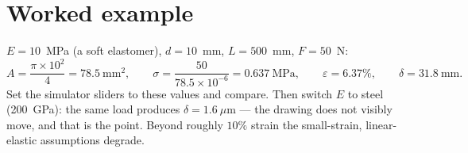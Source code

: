 \documentclass[10pt,a4paper]{article}
\begin{document}
\section*{Worked example}
$E = 10$~MPa (a soft elastomer), $d = 10$~mm, $L = 500$~mm, $F = 50$~N:
\begin{equation}
A = \frac{\pi \times 10^2}{4} = 78.5~\text{mm}^2, \qquad
\sigma = \frac{50}{78.5\times10^{-6}} = 0.637~\text{MPa}, \qquad
\varepsilon = 6.37\%, \qquad
\delta = 31.8~\text{mm}.
\end{equation}
Set the simulator sliders to these values and compare. Then switch $E$ to steel
(200~GPa): the same load produces $\delta = 1.6~\mu$m --- the drawing does not
visibly move, and that is the point. Beyond roughly $10\%$ strain the
small-strain, linear-elastic assumptions degrade.
\end{document}
